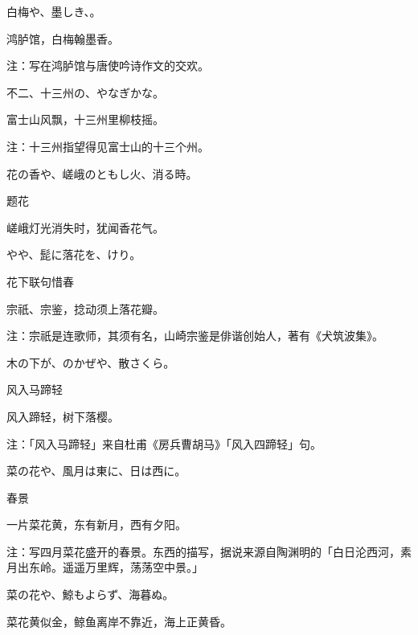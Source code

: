 \begin{haiku}
    {\FH 白梅や、墨しき、。}

    {\FK 鸿胪馆，白梅翰墨香。}

    {\FT 注：写在鸿胪馆与唐使吟诗作文的交欢。}
\end{haiku}

\begin{haiku}
    {\FH 不二、十三州の、やなぎかな。}

    {\FK 富士山风飘，十三州里柳枝摇。}

    {\FT 注：十三州指望得见富士山的十三个州。}
\end{haiku}

\begin{haiku}
    {\FH 花の香や、嵯峨のともし火、消る時。}

    {\FK 题花}

    {\FK 嵯峨灯光消失时，犹闻香花气。}
\end{haiku}

\begin{haiku}
    {\FH {}やや、髭に落花を、けり。}

    {\FK 花下联句惜春}

    {\FK 宗祇、宗鉴，捻动须上落花瓣。}

    {\FT 注：宗祇是连歌师，其须有名，山崎宗鉴是俳谐创始人，著有《犬筑波集》。}
\end{haiku}

\begin{haiku}
    {\FH 木の下が、のかぜや、散さくら。}

    {\FK 风入马蹄轻}

    {\FK 风入蹄轻，树下落樱。}

    {\FT 注：「风入马蹄轻」来自杜甫《房兵曹胡马》「风入四蹄轻」句。}
\end{haiku}

\begin{haiku}
    {\FH 菜の花や、風月は東に、日は西に。}

    {\FK 春景}

    {\FK 一片菜花黄，东有新月，西有夕阳。}

    {\FT 注：写四月菜花盛开的春景。东西的描写，据说来源自陶渊明的「白日沦西河，素月出东岭。遥遥万里辉，荡荡空中景。」}
\end{haiku}

\begin{haiku}
    {\FH 菜の花や、鯨もよらず、海暮ぬ。}

    {\FK 菜花黄似金，鲸鱼离岸不靠近，海上正黄昏。}
\end{haiku}

